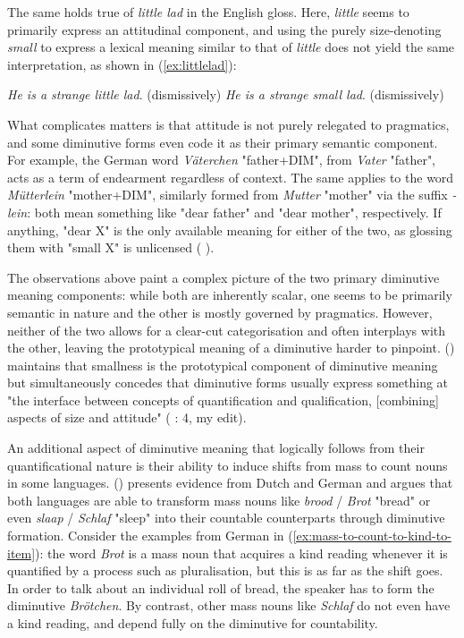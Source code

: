 The same holds true of \textit{little lad} in the English gloss. Here, \textit{little} seems to primarily express an attitudinal component, and using the purely size-denoting \textit{small} to express a lexical meaning similar to that of \textit{little} does not yield the same interpretation, as shown in (\ref{ex:littlelad}):

\begin{exe}
\ex \label{ex:littlelad}
\begin{xlist}
\ex \textit{He is a strange little lad}. (dismissively)
\ex *\textit{He is a strange small lad}. (dismissively)
\end{xlist}
\end{exe}

What complicates matters is that attitude is not purely relegated to pragmatics, and some diminutive forms even code it as their primary semantic component. For example, the German word \textit{Väterchen} "father+DIM", from \textit{Vater} "father", acts as a term of endearment regardless of context. The same applies to the word \textit{Mütterlein} "mother+DIM", similarly formed from \textit{Mutter} "mother" via the suffix \textit{-lein}: both mean something like "dear father" and "dear mother", respectively. If anything, "dear X" is the only available meaning for either of the two, as glossing them with "small X" is unlicensed  (\citeauthor{Schneider+2003} \citeyear{Schneider+2003}).

The observations above paint a complex picture of the two primary diminutive meaning components: while both are inherently scalar, one seems to be primarily semantic in nature and the other is mostly governed by pragmatics. However, neither of the two allows for a clear-cut categorisation and often interplays with the other, leaving the prototypical meaning of a diminutive harder to pinpoint. \citeauthor{Schneider+2003} (\citeyear{Schneider+2003}) maintains that smallness is the prototypical component of diminutive meaning but simultaneously concedes that diminutive forms usually express something at "the interface between concepts of quantification and qualification, [combining] aspects of size and attitude" (\citeauthor{Schneider+2003} \citeyear{Schneider+2003}: 4, my edit).

An additional aspect of diminutive meaning that logically follows from their quantificational nature is their ability to induce shifts from mass to count nouns in some languages. \citeauthor{Wiltschko+2006} (\citeyear{Wiltschko+2006}) presents evidence from Dutch and German and argues that both languages are able to transform mass nouns like \textit{brood} / \textit{Brot} "bread" or even \textit{slaap} / \textit{Schlaf} "sleep" into their countable counterparts through diminutive formation. Consider the examples from German in (\ref{ex:mass-to-count-to-kind-to-item}): the word \textit{Brot} is a mass noun that acquires a kind reading whenever it is quantified by a process such as pluralisation, but this is as far as the shift goes. In order to talk about an individual roll of bread, the speaker has to form the diminutive \textit{Brötchen}. By contrast, other mass nouns like \textit{Schlaf} do not even have a kind reading, and depend fully on the diminutive for countability.

